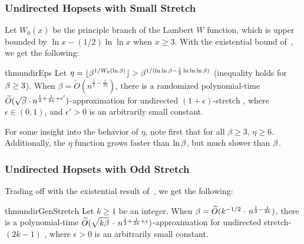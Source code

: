 \subsubsection{Undirected Hopsets with Small Stretch}
Let $W_0(x)$ be the principle branch of the Lambert $W$ function, which is upper bounded by $\ln{x} - (1/2) \ln{\ln{x}}$ when $x \geq 3$. With the existential bound of~\cite{EN19}, we get the following:
\begin{restatable}{thm}{undirEps} \label{thm:undir_eps}    
    Let $\eta = \lfloor \beta^{1/W_0(\ln{\beta})} \rfloor > \beta^{1/(\ln{\ln{\beta}}-\frac{1}{2}\ln{\ln{\ln{\beta}}})}$ (inequality holds for $\beta \geq 3$). When $\beta = \widetilde{O}(n^{\frac{1}{2} - \frac{1}{2\eta}})$, there is a randomized polynomial-time $\widetilde{O}(\sqrt{\beta} \cdot n^{\frac{1}{2} + \frac{1}{2\eta} + \epsilon'})$-approximation for undirected $(1+\epsilon)$-stretch {\hopset}, where $\epsilon \in (0,1)$, and $\epsilon' > 0$ is an arbitrarily small constant.
\end{restatable}
For some insight into the behavior of $\eta$, note first that for all $\beta \geq 3$, $\eta \geq 6$. Additionally, the $\eta$ function grows faster than $\ln{\beta}$, but much slower than $\beta$.


\subsubsection{Undirected Hopsets with Odd Stretch}
Trading off with the existential result of~\cite{TZ05}, we get the following:
\begin{restatable}{thm}{undirGenStretch} \label{thm:undir_gen_stretch}
    Let $k \geq 1$ be an integer. When $\beta = \widetilde{O}(k^{-1/2} \cdot \, n^{\frac{1}{2} - \frac{1}{2k}}) $, there is a polynomial-time $\widetilde{O}(\sqrt{k \be \vphantom{\be^k}} \, \cdot \, n^{\frac{1}{2} + \frac{1}{2k} + \epsilon})$-approximation for undirected stretch-$(2k-1)$ {\hopset}, where $\epsilon > 0$ is an arbitrarily small constant.
\end{restatable}

\fi






















